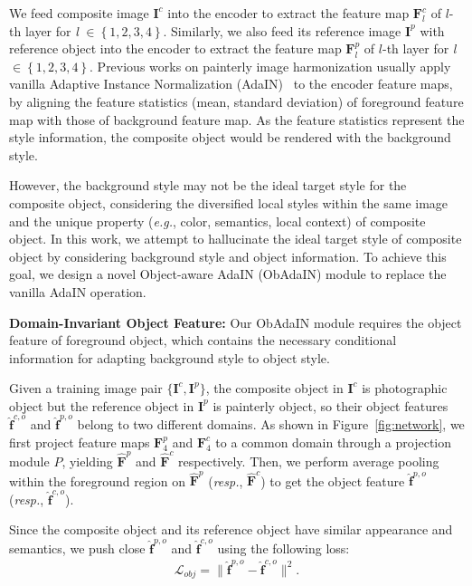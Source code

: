\documentclass[letterpaper]{article} %
\begin{document}
We feed composite image $\bm{I}^c$ into the encoder to extract the feature map $\bm{F}_l^c$ of $l$-th layer for \emph{l} $\in \left\{1, 2, 3, 4\right\}$. Similarly, we also feed its reference image $\bm{I}^p$ with reference object into the encoder to extract the feature map $\bm{F}^p_l$ of $l$-th layer for \emph{l} $\in \left\{1, 2, 3, 4\right\}$.
Previous works on painterly image harmonization \cite{peng2019element,cao2022painterly} usually apply vanilla Adaptive Instance Normalization (AdaIN)~\cite{huang2017arbitrary} to the encoder feature maps, by aligning the feature statistics (mean, standard deviation) of foreground feature map with those of background feature map. As the feature statistics represent the style information, the composite object would be rendered with the background style.

However, the background style may not be the ideal target style for the composite object, considering the diversified local styles within the same image and the unique property (\emph{e.g.}, color, semantics, local context) of composite object. In this work, we attempt to hallucinate the ideal target style of composite object by considering background style and object information. To achieve this goal, we design a novel Object-aware AdaIN (ObAdaIN) module to replace the vanilla AdaIN operation.

\textbf{Domain-Invariant Object Feature:} Our ObAdaIN module requires the object feature of foreground object, which contains the necessary conditional information for adapting background style to object style.

Given a training image pair $\{\bm{I}^c, \bm{I}^p\}$, the composite object in $\bm{I}^c$ is photographic object but the reference object in $\bm{I}^p$ is painterly object, so their object features $\hat{\bm{f}}^{c,o}$ and $\hat{\bm{f}}^{p,o}$ belong to two different domains. As shown in Figure~\ref{fig:network}, we first project feature maps $\bm{F}^p_4$ and $\bm{F}^c_4$ to a common domain through a projection module $P$, yielding $\hat{\bm{F}}^p$ and $\hat{\bm{F}}^c$ respectively. Then, we perform average pooling within the foreground region on  $\hat{\bm{F}}^p$ (\emph{resp.}, $\hat{\bm{F}}^c$) to get the object feature $\hat{\bm{f}}^{p,o}$ (\emph{resp.}, $\hat{\bm{f}}^{c,o}$).

Since the composite object and its reference object have similar appearance and semantics, we push close $\hat{\bm{f}}^{p,o}$ and $\hat{\bm{f}}^{c,o}$ using the following loss:
\begin{eqnarray}\label{eqn:loss_obj}
\mathcal{L}_{obj} = \|\hat{\bm{f}}^{p,o}-\hat{\bm{f}}^{c,o}\|^2.
\end{eqnarray}
\end{document}

